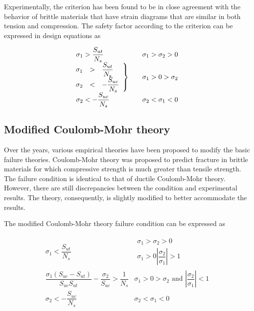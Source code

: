 \documentclass[
10pt,
a4paper,
openany,
svgnames,
]{book} %
\begin{document}
Experimentally, the criterion has been found to be in close agreement with the behavior of brittle materials that have strain diagrams that are similar in both tension and compression. The safety factor according to the criterion can be expressed in design equations as

\begin{equation}
  \begin{array}{l l l}
  \sigma_1 > \dfrac{S_{ut}}{N_s} & & \sigma_1 > \sigma_2 > 0 \\
  \left. \hspace{-0.23cm}
  \begin{array}{l l l}
    \sigma_1 & > & \dfrac{S_{ut}}{N_s} \\
    \sigma_2 & < & -\dfrac{S_{uc}}{N_s}
    \end{array} \right\} & & \sigma_1 > 0 > \sigma_2 \\
    \sigma_2 <  - \dfrac{S_{uc}}{N_s} & & \sigma _2 < \sigma _1 < 0
  \end{array}
\end{equation}

\subsection{Modified Coulomb-Mohr theory}

Over the years, various empirical theories have been proposed to modify the basic failure theories. Coulomb-Mohr theory was proposed to predict fracture in brittle materials for which compressive strength is much greater than tensile strength. The failure condition is identical to that of ductile Coulomb-Mohr theory. However, there are still discrepancies between the condition and experimental results. The theory, consequently, is slightly modified to better accommodate the results.

The modified Coulomb-Mohr theory failure condition can be expressed as

\begin{equation}
  \begin{array}{cc}
    \sigma_1 < \dfrac{S_{ut}}{N_s} &
      \begin{gathered}
        \sigma_1 > \sigma_2 > 0 \\ 
        \sigma_1 > 0 \left| \dfrac{\sigma_2}{\sigma_1} \right| > 1 
      \end{gathered} \\[20pt]
    \dfrac{\sigma_1(S_{uc} - S_{ut})}{S_{uc}S_{ut}} - \dfrac{\sigma_2}{S_{uc}} > \dfrac{1}{N_s} & \sigma_1 > 0 > \sigma_2\text{ and }\left| \dfrac{\sigma_2}{\sigma_1} \right| < 1 \\[10pt]
    \sigma_2 <  -\dfrac{S_{uc}}{N_s} & \sigma_2 < \sigma_1 < 0
  \end{array}
\end{equation}
\end{document}
